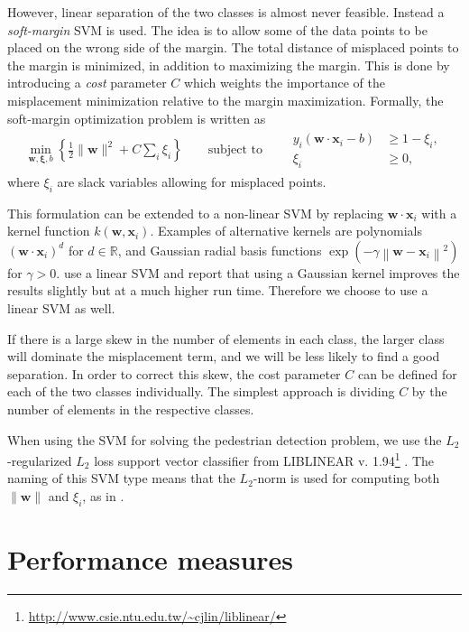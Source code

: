 \documentclass[thesis.tex]{subfiles}
\def\x{\mathbf{x}}
\def\w{\mathbf{w}}
\begin{document}
However, linear separation of the two classes is almost never feasible. Instead a \emph{soft-margin} SVM is used. The idea is to allow some of the data points to be placed on the wrong side of the margin. The total distance of misplaced points to the margin is minimized, in addition to maximizing the margin. This is done by introducing a \emph{cost} parameter $C$ which weights the importance of the misplacement minimization relative to the margin maximization. Formally, the soft-margin optimization problem is written as
%
\begin{align}
\label{eq:svmDefinition}
\min_{\w,\boldsymbol{\xi},b} \left\{ \frac12 \| \w \|^2 + C \sum_i \xi_i \right\} \qquad \text{subject to} \qquad \begin{aligned} y_i (\w \cdot \x_i - b) &\geq 1 - \xi_i, \\ \xi_i &\geq 0, \end{aligned}
\end{align}
%
where $\xi_i$ are slack variables allowing for misplaced points.

This formulation can be extended to a non-linear SVM by replacing $\w \cdot \x_i$ with a kernel function $k(\w,\x_i)$. Examples of alternative kernels are polynomials $\left( \w \cdot \x_i \right)^d$ for $d \in \mathbb{R}$, and Gaussian radial basis functions $\exp \left( -\gamma \left \| \w - \x_i  \right \|^2  \right)$ for $\gamma > 0$. \citet{dalal2005histograms} use a linear SVM and report that using a Gaussian kernel improves the results slightly but at a much higher run time. Therefore we choose to use a linear SVM as well.

If there is a large skew in the number of elements in each class, the larger class will dominate the misplacement term, and we will be less likely to find a good separation. In order to correct this skew, the cost parameter $C$ can be defined for each of the two classes individually. The simplest approach is dividing $C$ by the number of elements in the respective classes.

When using the SVM for solving the pedestrian detection problem, we use the $L_2$-regularized $L_2$ loss support vector classifier from LIBLINEAR v. 1.94\footnote{\url{http://www.csie.ntu.edu.tw/~cjlin/liblinear/}} \cite{fan2008liblinear}. The naming of this SVM type means that the $L_2$-norm is used for computing both $\| \w \|$ and $\xi_i$, as in .

\section{Performance measures}
\end{document}
